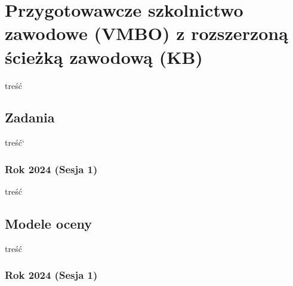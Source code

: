 \documentclass[
  letterpaper,
  DIV=11,
  numbers=noendperiod]{scrreprt}
\begin{document}

\chapter{Przygotowawcze szkolnictwo zawodowe (VMBO) z rozszerzoną
ścieżką zawodową
(KB)}\label{przygotowawcze-szkolnictwo-zawodowe-vmbo-z-rozszerzonux105-ux15bcieux17ckux105-zawodowux105-kb}

treść

\section{Zadania}\label{zadania-1}

treść`

\subsection{Rok 2024 (Sesja 1)}\label{rok-2024-sesja-1-2}

treść



\section{Modele oceny}\label{modele-oceny-1}

treść

\subsection{Rok 2024 (Sesja 1)}\label{rok-2024-sesja-1-3}


\end{document}
